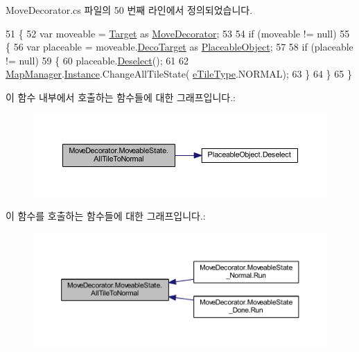 Move\+Decorator.\+cs 파일의 50 번째 라인에서 정의되었습니다.


\begin{DoxyCode}
51         \{
52             var moveable = \hyperlink{class_m_c_n_1_1_state_a79a563b32f183c9adc9a96679fc57eb8}{Target} as \hyperlink{class_move_decorator}{MoveDecorator};
53 
54             \textcolor{keywordflow}{if} (moveable != null)
55             \{
56                 var placeable = moveable.\hyperlink{class_m_c_n_1_1_decorator_a1306a0a8b814650cd5970a1ffc7ba2fe}{DecoTarget} as \hyperlink{class_placeable_object}{PlaceableObject};
57 
58                 \textcolor{keywordflow}{if} (placeable != null)
59                 \{
60                     placeable.\hyperlink{class_placeable_object_a0c1248b1f9981ddbf68e6f70a6498f3d}{Deselect}();
61 
62                     \hyperlink{class_map_manager}{MapManager}.\hyperlink{class_m_c_n_1_1_mono_singletone_aa50c027cca64cf4ad30c1ee5c83e0b78}{Instance}.ChangeAllTileState(
      \hyperlink{_tile_8cs_a271bc07be325bca511bcb747e0ff2fda}{eTileType}.NORMAL);
63                 \}
64             \}
65         \}
\end{DoxyCode}


이 함수 내부에서 호출하는 함수들에 대한 그래프입니다.\+:
\nopagebreak
\begin{figure}[H]
\begin{center}
\leavevmode
\includegraphics[width=350pt]{class_move_decorator_1_1_moveable_state_a2b63f058084f2548f8547c21715d271c_cgraph}
\end{center}
\end{figure}




이 함수를 호출하는 함수들에 대한 그래프입니다.\+:
\nopagebreak
\begin{figure}[H]
\begin{center}
\leavevmode
\includegraphics[width=350pt]{class_move_decorator_1_1_moveable_state_a2b63f058084f2548f8547c21715d271c_icgraph}
\end{center}
\end{figure}


